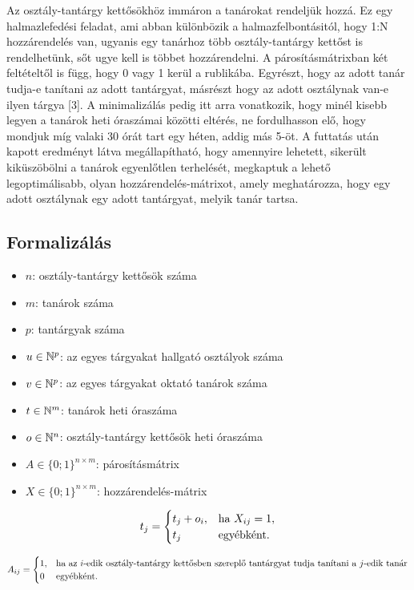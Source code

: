 \documentclass[12pt,a4paper]{report}
\begin{document}
Az osztály-tantárgy kettősökhöz immáron a tanárokat rendeljük hozzá. Ez egy halmazlefedési feladat, ami abban különbözik a halmazfelbontásitól, hogy 1:N hozzárendelés van, ugyanis egy tanárhoz több osztály-tantárgy kettőst is rendelhetünk, sőt ugye kell is többet hozzárendelni. A párosításmátrixban két feltételtől is függ, hogy 0 vagy 1 kerül a rublikába. Egyrészt, hogy az adott tanár tudja-e tanítani az adott tantárgyat, másrészt hogy az adott osztálynak van-e ilyen tárgya [3]. A minimalizálás pedig itt arra vonatkozik, hogy minél kisebb legyen a tanárok heti óraszámai közötti eltérés, ne fordulhasson elő, hogy mondjuk míg valaki 30 órát tart egy héten, addig más 5-öt.
A futtatás után kapott eredményt látva megállapítható, hogy amennyire lehetett, sikerült kiküszöbölni a tanárok egyenlőtlen terhelését, megkaptuk a lehető legoptimálisabb, olyan hozzárendelés-mátrixot, amely meghatározza, hogy egy adott osztálynak egy adott tantárgyat, melyik tanár tartsa.

\subsection{Formalizálás}

\begin{itemize}
    \item $n$: osztály-tantárgy kettősök száma
    \item $m$: tanárok száma
    \item $p$: tantárgyak száma
    \item $u \in \Bbb{N}^p$: az egyes tárgyakat hallgató osztályok száma
    \item $v \in \Bbb{N}^p$: az egyes tárgyakat oktató tanárok száma
    \item $t \in \Bbb{N}^m$: tanárok heti óraszáma
    \item $o \in \Bbb{N}^n$: osztály-tantárgy kettősök heti óraszáma
    \item $A \in \{0;1\}^{n \times m}$: párosításmátrix
    \item $X \in \{0;1\}^{n \times m}$: hozzárendelés-mátrix
\end{itemize}

\[
t_{j} =
\begin{cases}
t_j+o_i,& \hbox{ha } X_{ij}=1, \\
t_j & \hbox{egyébként}.
\end{cases}
\]

\[
A_{ij} =
\begin{cases}
1, & \hbox{ha az $i$-edik osztály-tantárgy kettősben szereplő tantárgyat tudja tanítani a $j$-edik tanár} \\
0 & \hbox{egyébként}.
\end{cases}
\]
\end{document}
